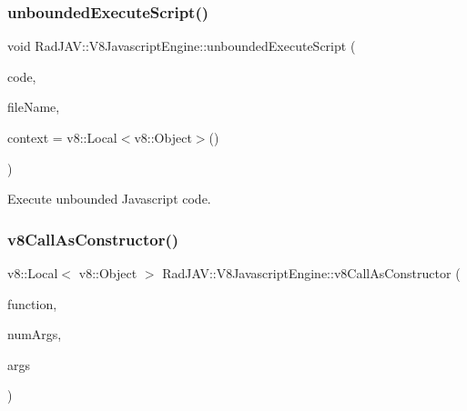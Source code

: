 \mbox{\label{class_rad_j_a_v_1_1_v8_javascript_engine_af5d6bcaa4575a6a1f724029365139c65}} 
\subsubsection{\texorpdfstring{unbounded\+Execute\+Script()}{unboundedExecuteScript()}}
{\footnotesize\ttfamily void Rad\+J\+A\+V\+::\+V8\+Javascript\+Engine\+::unbounded\+Execute\+Script (\begin{DoxyParamCaption}\item[{\mbox{\hyperlink{class_rad_j_a_v_1_1_string}{String}}}]{code,  }\item[{\mbox{\hyperlink{class_rad_j_a_v_1_1_string}{String}}}]{file\+Name,  }\item[{v8\+::\+Local$<$ v8\+::\+Object $>$}]{context = {\ttfamily v8\+:\+:Local$<$v8\+:\+:Object$>$()} }\end{DoxyParamCaption})}



Execute unbounded Javascript code. 

\mbox{\label{class_rad_j_a_v_1_1_v8_javascript_engine_a69ece27850f67c44a45292377f953823}} 
\subsubsection{\texorpdfstring{v8\+Call\+As\+Constructor()}{v8CallAsConstructor()}}
{\footnotesize\ttfamily v8\+::\+Local$<$ v8\+::\+Object $>$ Rad\+J\+A\+V\+::\+V8\+Javascript\+Engine\+::v8\+Call\+As\+Constructor (\begin{DoxyParamCaption}\item[{v8\+::\+Local$<$ v8\+::\+Object $>$}]{function,  }\item[{R\+J\+I\+NT}]{num\+Args,  }\item[{v8\+::\+Local$<$ v8\+::\+Value $>$ $\ast$}]{args }\end{DoxyParamCaption})}



